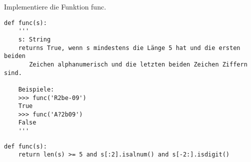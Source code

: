 \question[3] Implementiere die Funktion func.

\begin{lstlisting}
def func(s):
    '''
    s: String
    returns True, wenn s mindestens die Länge 5 hat und die ersten beiden
       Zeichen alphanumerisch und die letzten beiden Zeichen Ziffern sind.

    Beispiele:
    >>> func('R2be-09')
    True
    >>> func('A?2b09')
    False
    '''

\end{lstlisting}
\begin{solutionbox}{3cm}
\begin{lstlisting}
def func(s):
    return len(s) >= 5 and s[:2].isalnum() and s[-2:].isdigit()
\end{lstlisting}
\end{solutionbox}
